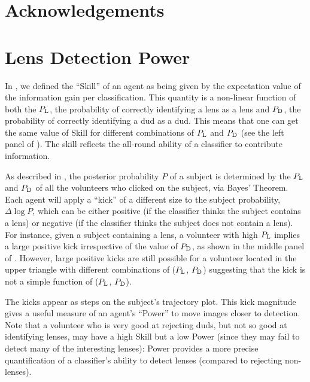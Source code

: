 \documentclass[useAMS,usenatbib,a4paper]{mn2e}
\begin{document}
\twocolumn
\section*{Acknowledgements}





\appendix


\section{Lens Detection Power}
\label{appendix:power}

In \PaperOne, we defined the ``Skill'' of an agent as being given by the
expectation value of the information gain per classification. This
quantity is a non-linear function of both the $P_{\rm L}$, the
probability of correctly identifying a lens as a lens and $P_{\rm D}$,
the probability of correctly identifying a dud as a dud. This means that
one can get the same value of Skill for different combinations of
$P_{\rm L}$ and $P_{\rm D}$ (see the left panel of
). The skill reflects the all-round ability of a
classifier to contribute information.

As described in \PaperOne, the posterior probability $P$
of a subject is determined by the $P_{\rm L}$ and $P_{\rm D}$ of all the
volunteers who clicked on the subject, via Bayes' Theorem. Each agent
will apply a ``kick'' of a different size to the subject probability,
$\Delta\log{P}$, which can be either positive (if the classifier thinks
the subject contains a lens) or negative (if the classifier thinks the
subject does not contain a lens). For instance, given a subject
containing a lens, a volunteer with high $P_{\rm L}$
implies a large positive kick irrespective of the value of
$P_{\rm D}$, as shown in the middle panel of
. However, large positive kicks are
still possible for a volunteer located in the upper triangle
with different combinations of ($P_{\rm L}$, $P_{\rm D}$) suggesting that
the kick is not a simple function of ($P_{\rm L}$, $P_{\rm D}$).

The kicks appear as steps on the subject's trajectory plot. This kick
magnitude gives a useful measure of an agent's ``Power'' to move
images closer to detection.  Note that a volunteer who is very good at
rejecting duds, but not so good at identifying lenses, may have a high
Skill but a low Power (since they may fail to detect many of the
interesting lenses): Power provides a more precise quantification of a
classifier's ability to detect lenses (compared to rejecting non-lenses).
\end{document}
